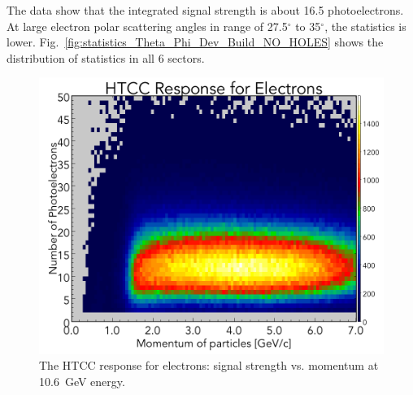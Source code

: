 The data show that the integrated signal strength is about 16.5 photoelectrons. At large electron polar scattering
angles in range of 27.5$^\circ$ to 35$^\circ$, the statistics is lower.
Fig.~\ref{fig:statistics_Theta_Phi_Dev_Build_NO_HOLES} shows the distribution of statistics in all 6 sectors. 

\begin{figure}[!ht]
    \centering
    \includegraphics[width=1.0\linewidth,trim={0.0cm 0.0cm 0.0cm 1.73cm},clip]{images/HTCC_Response_run4013.png}
    \caption{The HTCC response for electrons: signal strength vs. momentum at 10.6~GeV energy.}
    \label{fig:HTCC_Response_run4013}
\end{figure}

